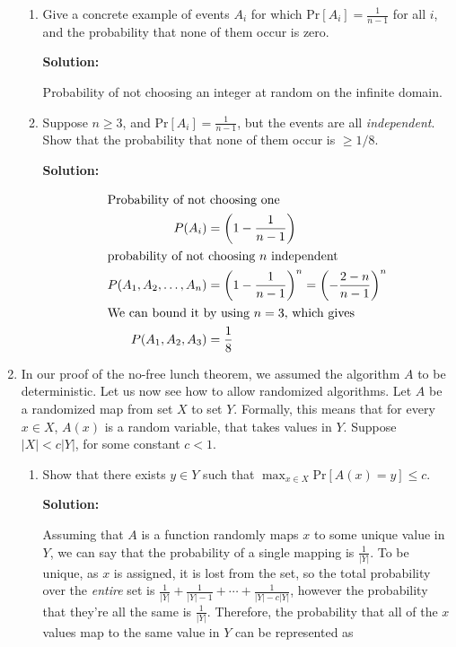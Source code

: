 \documentclass[12pt]{article}
\newcommand{\abs}[1]{\left| #1 \right|}
\renewcommand{\Pr}[1]{\text{Pr}[ #1 ]}
\begin{document}
\begin{enumerate}
\begin{enumerate}
\item Give a concrete example of events $A_{i}$ for which $\Pr{A_{i}} = \frac{1}{n-1}$ for all $i$, and the probability that none of them occur is zero.

{\bf Solution:}

Probability of not choosing an integer at random on the infinite domain.

\item Suppose $n \geq 3$, and $\Pr{A_{i}} = \frac{1}{n-1}$, but the events are all {\em independent}. Show that the probability that none of them occur is $\geq 1/8$.

{\bf Solution:}

\begin{align*}
\intertext{Probability of not choosing one}
P(A_{i}) &= \left( 1 - \frac{1}{n-1}\right)\\
\intertext{probability of not choosing $n$ independent}
P(A_{1}, A_{2}, \ldots, A_{n}) &= \left( 1 - \frac{1}{n-1}\right)^{n} = \left( - \frac{2-n}{n-1}\right)^{n}\\
\intertext{We can bound it by using $n = 3$, which gives}
P(A_{1}, A_{2}, A_{3}) &= \frac{1}{8}
\end{align*}
\end{enumerate}

\item In our proof of the no-free lunch theorem, we assumed the algorithm $A$ to be deterministic. Let us now see how to allow randomized algorithms. Let $A$ be a randomized map from set $X$ to set $Y$. Formally, this means that for every $x \in X$, $A(x)$ is a random variable, that takes values in $Y$. Suppose $\abs{X} < c\abs{Y}$, for some constant $c < 1$. 

\begin{enumerate}
\item Show that there exists $y \in Y$ such that $\max_{x\in X}\Pr{A(x) = y} \leq c$.

{\bf Solution:}

Assuming that $A$ is a function randomly maps $x$ to some unique value in $Y$, we can say that the probability of a single mapping is $\frac{1}{|Y|}$. To be unique, as $x$ is assigned, it is lost from the set, so the total probability over the {\em entire} set is $\frac{1}{|Y|} + \frac{1}{|Y|-1} + \cdots + \frac{1}{|Y| - c|Y|}$, however the probability that they're all the same is $\frac{1}{|Y|}$. Therefore, the probability that all of the $x$ values map to the same value in $Y$ can be represented as


\end{enumerate}
\end{enumerate}
\end{document}
